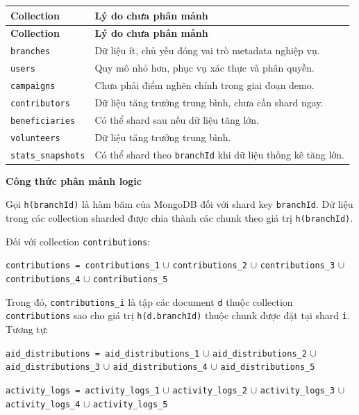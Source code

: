 \documentclass[12pt,a4paper]{article}
\begin{document}
\begin{center}
\small
\begin{longtable}{|p{3.7cm}|p{8.8cm}|}
\hline
\textbf{Collection} & \textbf{Lý do chưa phân mảnh} \\ \hline
\endfirsthead
\hline
\textbf{Collection} & \textbf{Lý do chưa phân mảnh} \\ \hline
\endhead
\texttt{branches} & Dữ liệu ít, chủ yếu đóng vai trò metadata nghiệp vụ. \\ \hline
\texttt{users} & Quy mô nhỏ hơn, phục vụ xác thực và phân quyền. \\ \hline
\texttt{campaigns} & Chưa phải điểm nghẽn chính trong giai đoạn demo. \\ \hline
\texttt{contributors} & Dữ liệu tăng trưởng trung bình, chưa cần shard ngay. \\ \hline
\texttt{beneficiaries} & Có thể shard sau nếu dữ liệu tăng lớn. \\ \hline
\texttt{volunteers} & Dữ liệu tăng trưởng trung bình. \\ \hline
\texttt{stats\_snapshots} & Có thể shard theo \texttt{branchId} khi dữ liệu thống kê tăng lớn. \\ \hline
\end{longtable}
\normalsize
\end{center}

\textbf{Công thức phân mảnh logic}

Gọi \texttt{h(branchId)} là hàm băm của MongoDB đối với shard key \texttt{branchId}. Dữ liệu trong các collection sharded được chia thành các chunk theo giá trị \texttt{h(branchId)}.

Đối với collection \texttt{contributions}:

\begin{center}
\texttt{contributions = contributions\_1} $\cup$ \texttt{contributions\_2} $\cup$ \texttt{contributions\_3} $\cup$ \texttt{contributions\_4} $\cup$ \texttt{contributions\_5}
\end{center}

Trong đó, \texttt{contributions\_i} là tập các document \texttt{d} thuộc collection \texttt{contributions} sao cho giá trị \texttt{h(d.branchId)} thuộc chunk được đặt tại shard \texttt{i}. Tương tự:

\begin{center}
\texttt{aid\_distributions = aid\_distributions\_1} $\cup$ \texttt{aid\_distributions\_2} $\cup$ \texttt{aid\_distributions\_3} $\cup$ \texttt{aid\_distributions\_4} $\cup$ \texttt{aid\_distributions\_5}

\texttt{activity\_logs = activity\_logs\_1} $\cup$ \texttt{activity\_logs\_2} $\cup$ \texttt{activity\_logs\_3} $\cup$ \texttt{activity\_logs\_4} $\cup$ \texttt{activity\_logs\_5}
\end{center}
\end{document}
